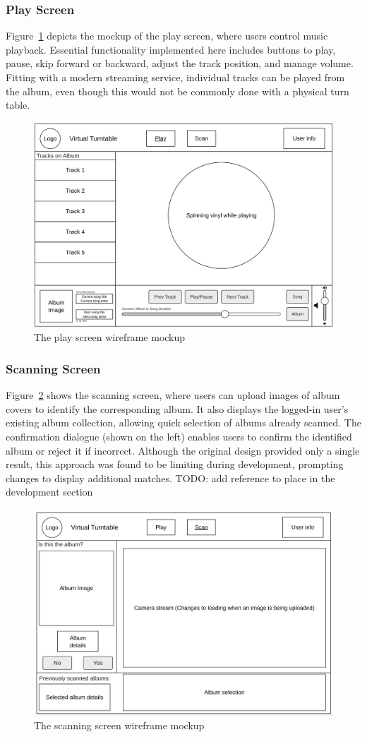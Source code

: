 \subsubsection{Play Screen}
Figure~\ref{fig:play_screen_mockup} depicts the mockup of the play screen, where users control music playback. Essential functionality implemented here includes buttons to play, pause, skip forward or backward, adjust the track position, and manage volume. Fitting with a modern streaming service, individual tracks can be played from the album, even though this would not be commonly done with a physical turn table.
\begin{figure} [H]
    \centering
    \includegraphics[width=0.6\linewidth]{figures/play_screen_mockup.png}
    \caption{The play screen wireframe mockup}
    \label{fig:play_screen_mockup}
\end{figure}

\subsubsection{Scanning Screen}
Figure~\ref{fig:scan_screen_mockup} shows the scanning screen, where users can upload images of album covers to identify the corresponding album. It also displays the logged-in user’s existing album collection, allowing quick selection of albums already scanned. The confirmation dialogue (shown on the left) enables users to confirm the identified album or reject it if incorrect. Although the original design provided only a single result, this approach was found to be limiting during development, prompting changes to display additional matches. TODO: add reference to place in the development section

\begin{figure} [H]
    \centering
    \includegraphics[width=0.6\linewidth]{figures/scan_screen_mockup.png}
    \caption{The scanning screen wireframe mockup}
    \label{fig:scan_screen_mockup}
\end{figure}


